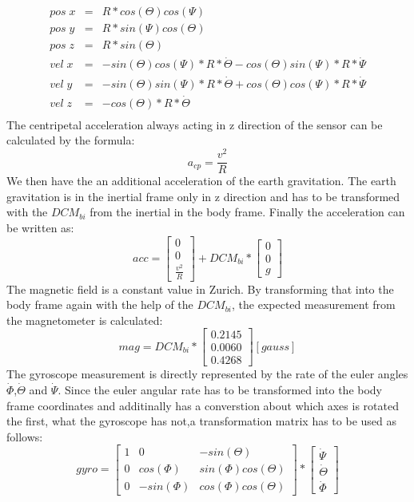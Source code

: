 \begin{eqnarray}
pos\;x&=&R*cos(\Theta)cos(\Psi)\\
pos\;y&=&R*sin(\Psi)cos(\Theta)\\
pos\;z&=&R*sin(\Theta)\\
vel\;x&=&-sin(\Theta)cos(\Psi)*R*\dot{\Theta}-cos(\Theta)sin(\Psi)*R*\dot{\Psi}\\
vel\;y&=&-sin(\Theta)sin(\Psi)*R*\dot{\Theta}+cos(\Theta)cos(\Psi)*R*\dot{\Psi}\\
vel\;z&=&-cos(\Theta)*R*\dot{\Theta}\\
\end{eqnarray}
The centripetal acceleration always acting in z direction of the sensor can be calculated by the formula:
\begin{equation}
a_{cp}=\frac{v^2}{R}
\end{equation}
We then have the an additional acceleration of the earth gravitation. The earth gravitation is in the inertial frame only in z direction and has to be transformed with the $DCM_{bi}$ from the inertial in the body frame. Finally the acceleration can be written as:
\begin{equation}
acc= \begin{bmatrix} 0\\0\\ \frac{v^2}{R}\end{bmatrix}+DCM_{bi}*\begin{bmatrix}0\\0\\g\end{bmatrix}
\end{equation}
The magnetic field is  a constant value in Zurich. By transforming that into the body frame again with the help of the $DCM_{bi}$, the expected measurement from the magnetometer is calculated:
\begin{equation}
mag= DCM_{bi}* \begin{bmatrix} 0.2145 \\ 0.0060 \\ 0.4268 \end{bmatrix} [gauss]
\end{equation} 
The gyroscope measurement is directly represented by the rate of the euler angles $\dot{\Phi}$,$\dot{\Theta}$ and $\dot{\Psi}$. Since the euler angular rate has to be transformed into the body frame coordinates and additinally has a converstion about which axes is rotated the first, what the gyroscope has not,a transformation matrix has to be used as follows:
\begin{equation}
gyro=\begin{bmatrix} 1 & 0 & -sin(\Theta) \\ 0 & cos(\Phi) & sin(\Phi) cos(\Theta) \\ 0 & -sin(\Phi) & cos(\Phi)cos(\Theta) \end{bmatrix}*\begin{bmatrix} \dot{\Psi}\\ \dot{\Theta}\\ \dot{\Phi} \end{bmatrix}
\end{equation}
